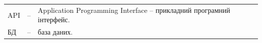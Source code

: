 
\noindent
\begin{longtable}{@{}p{2.5cm} p{0.4cm} p{12.5cm}@{}}
API & -- & Application Programming Interface -- прикладний програмний інтерфейс.\\
БД & -- & база даних.\\
\end{longtable}
